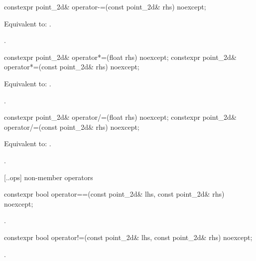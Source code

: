 %
\begin{itemdecl}
constexpr point_2d& operator-=(const point_2d& rhs) noexcept;
\end{itemdecl}
\begin{itemdescr}
\pnum
\effects
Equivalent to: .

\pnum
\returns
{}.
\end{itemdescr}

%
\begin{itemdecl}
constexpr point_2d& operator*=(float rhs) noexcept;
constexpr point_2d& operator*=(const point_2d& rhs) noexcept;
\end{itemdecl}
\begin{itemdescr}
\pnum
\effects
Equivalent to: .

\pnum
\returns
{}.
\end{itemdescr}

%
\begin{itemdecl}
constexpr point_2d& operator/=(float rhs) noexcept;
constexpr point_2d& operator/=(const point_2d& rhs) noexcept;
\end{itemdecl}
\begin{itemdescr}
\pnum
\effects
Equivalent to: .

\pnum
\returns
{}.
\end{itemdescr}

 [\iotwod.\pointtwod.ops] { non-member operators}

%
\begin{itemdecl}
constexpr bool operator==(const point_2d& lhs, const point_2d& rhs) noexcept;
\end{itemdecl}
\begin{itemdescr}
\pnum
\returns
{}.
\end{itemdescr}

%
\begin{itemdecl}
constexpr bool operator!=(const point_2d& lhs, const point_2d& rhs) noexcept;
\end{itemdecl}
\begin{itemdescr}
\pnum
\returns
{}.
\end{itemdescr}

